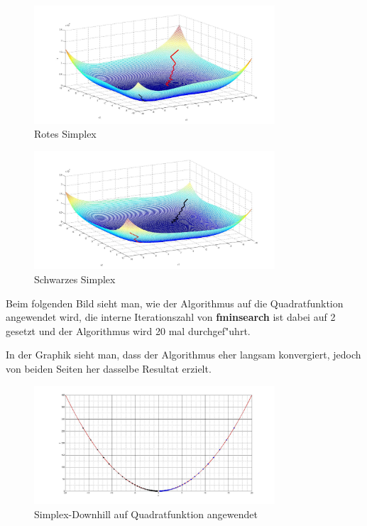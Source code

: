 \begin{figure}[h]
	\centering
	\includegraphics[width=0.8\textwidth]{../bilder/Himmelblau3DRot.jpg}%
  	\caption{Rotes Simplex}%
	\label{fig:HB2}%
\end{figure}
\begin{figure}[h]
	\centering
	\includegraphics[width=0.8\textwidth]{../bilder/Himmelblau3DSchwarz.jpg}%
  	\caption{Schwarzes Simplex}%
	\label{fig:HB3}%
\end{figure}

Beim folgenden Bild sieht man, wie der Algorithmus auf die Quadratfunktion angewendet wird, die interne Iterationszahl von \textbf{fminsearch} ist dabei auf 2 gesetzt und der Algorithmus wird 20 mal durchgef"uhrt.

In der Graphik sieht man, dass der Algorithmus eher langsam konvergiert, jedoch von beiden Seiten her dasselbe Resultat erzielt. 
\begin{figure}[h]
	\centering
	\includegraphics[width=0.8\textwidth]{../bilder/Quadrat.jpg}%
  	\caption{Simplex-Downhill auf Quadratfunktion angewendet}%
	\label{fig:SQ1}%
\end{figure}
